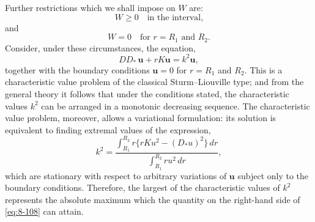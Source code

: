 Further restrictions which we shall impose on $W$ are:
\begin{equation}
\label{eq:8-106}
W \geqslant 0 \quad \text{in the interval,}
\end{equation}
and
\begin{equation}
\label{eq:8-106b}
W = 0 \quad \text{for } r = R_1 \text{ and } R_2.
\end{equation}
Consider, under these circumstances, the equation,
\begin{equation}
\label{eq:8-107}
DD_*\,\mathbf{u} + rK\mathbf{u} = k^2\mathbf{u},
\end{equation}
together with the boundary conditions $\mathbf{u} = 0$ for $r = R_1$ and $R_2$. This is a characteristic value problem of the classical Sturm--Liouville type; and from the general theory it follows that under the conditions stated, the characteristic values $k^2$ can be arranged in a monotonic decreasing sequence. The characteristic value problem, moreover, allows a variational formulation: its solution is equivalent to finding extremal values of the expression,
\begin{equation}
\label{eq:8-108}
k^2 = \frac{\displaystyle\int_{R_1}^{R_2} r\bigl\{rKu^2 - (D_*u)^2\bigr\}\,dr}{\displaystyle\int_{R_1}^{R_2} ru^2\,dr},
\end{equation}
which are stationary with respect to arbitrary variations of $\mathbf{u}$ subject only to the boundary conditions. Therefore, the largest of the characteristic values of $k^2$ represents the absolute maximum which the quantity on the right-hand side of \eqref{eq:8-108} can attain.

